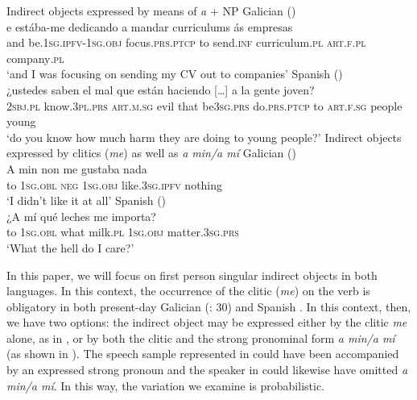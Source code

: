 \documentclass[output=paper]{langscibook}
\begin{document}
\ex%
    Indirect objects expressed by means of \textit{a} + NP\label{ex:brown:2}
    \ea Galician ()\\
    \gll e estába-me dedicando {a mandar} curriculums ás empresas\\ 
         and be.\textsc{1sg.ipfv}-1\textsc{sg.obj} focus.\textsc{prs.ptcp} {to send.\textsc{inf}} curriculum.\textsc{pl} \textsc{art.f.pl} company\textsc{.pl}\\
    \glt ‘and I was focusing on sending my CV out to companies’ 
    \ex Spanish ()\\
    \gll ¿ustedes         saben                  el                mal que  están              haciendo […] a la gente joven?\\ 
         2\textsc{sbj.pl} know\textsc{.3pl.prs} \textsc{art.m.sg} evil that be\textsc{3sg.prs} do\textsc{.prs.ptcp} {} to \textsc{art.f.sg} people young\\
    \glt ‘do you know how much harm they are doing to young people?’
    \z
\ex%
    Indirect objects expressed by clitics (\textit{me}) as well as \textit{a min\slash a mí}\label{ex:brown:3}
    \ea Galician ()\\
    \gll A min non me gustaba nada\\
         to 1\textsc{sg.obl} \textsc{neg} 1\textsc{sg.obj} like\textsc{.3sg.ipfv} nothing\\
    \glt ‘I didn’t like it at all’
    \ex Spanish ()\\
    \gll ¿A mí qué leches me importa?\\
         to 1\textsc{sg.obl} what milk\textsc{.pl} \textsc{1sg.obj} matter\textsc{.3sg.prs}\\
    \glt ‘What the hell do I care?’   
    \z
\z

In this paper, we will focus on first person singular indirect objects in both languages. In this context, the occurrence of the clitic (\textit{me}) on the verb is obligatory in both present-day Galician (\citealt{ExpósitoLoureiro2016}: 30) and Spanish \parencites[536]{Company2006}[52]{PericchiVelde2020}. In this context, then, we have two options: the indirect object may be expressed either by the clitic \textit{me} alone, as in , or by both the clitic and the strong pronominal form \textit{a min\slash a mí} (as shown in ). The speech sample represented in  could have been accompanied by an expressed strong pronoun and the speaker in  could likewise have omitted \textit{a min\slash a mí}. In this way, the variation we examine is probabilistic. 
\end{document}
